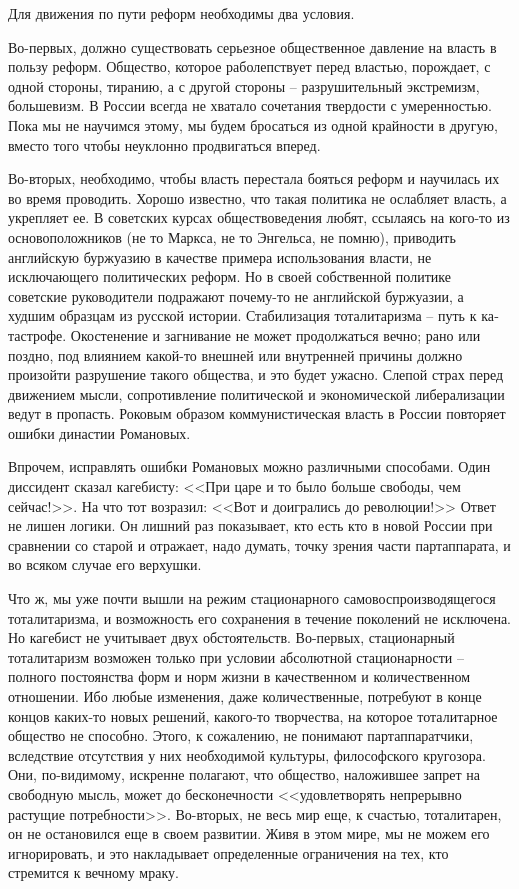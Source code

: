 \documentclass{book}
\begin{document}
Для движения по пути реформ необходимы два условия.

Во-первых, должно существовать серьезное общественное давление на власть в пользу реформ. Общество, которое раболепствует перед властью, порождает, с одной стороны, тиранию, а с другой стороны -- разрушительный экстремизм, большевизм. В России всегда не хватало сочетания твердости с уме­ренностью. Пока мы не научимся этому, мы будем бросаться из одной крайности в другую, вместо того чтобы неуклонно продвигаться вперед.

Во-вторых, необходимо, чтобы власть перестала бояться реформ и научилась их во время проводить. Хорошо известно, что такая политика не ослабляет власть, а укрепляет ее. В советских курсах обществоведения любят, ссылаясь на кого-то из основоположников (не то Маркса, не то Энгельса, не помню), приводить английскую буржуазию в качестве примера использования власти, не исключающего политических реформ. Но в своей собственной политике советские руководители подра­жают почему-то не английской буржуазии, а худшим образцам из русской истории. Стабилизация тоталитаризма -- путь к ка­тастрофе. Окостенение и загнивание не может продолжаться вечно; рано или поздно, под влиянием какой-то внешней или внутренней причины должно произойти разрушение такого об­щества, и это будет ужасно. Слепой страх перед движением мысли, сопротивление политической и экономической либера­лизации ведут в пропасть. Роковым образом коммунистиче­ская власть в России повторяет ошибки династии Романовых.

Впрочем, исправлять ошибки Романовых можно различны­ми способами. Один диссидент сказал кагебисту: <<При царе и то было больше свободы, чем сейчас!>>. На что тот возразил: <<Вот и доигрались до революции!>> Ответ не лишен логики. Он лишний раз показывает, кто есть кто в новой России при сравнении со старой и отражает, надо думать, точку зрения части партаппарата, и во всяком случае его верхушки.

Что ж, мы уже почти вышли на режим стационарного самовоспроизводящегося тоталитаризма, и возможность его сохранения в течение поколений не исключена. Но кагебист не учитывает двух обстоятельств. Во-первых, стационарный тоталитаризм возможен только при условии абсолютной  стационарности -- полного постоянства форм и норм жизни в качественном и количественном отношении. Ибо любые изменения, даже количественные, потребуют в конце концов каких-то новых решений, какого-то творчества, на которое тоталитарное общество не способно. Этого, к сожалению, не понимают партаппаратчики, вследствие отсутствия у них необходимой куль­туры, философского кругозора. Они, по-видимому, искренне полагают, что общество, наложившее запрет на свободную мысль, может до бесконечности <<удовлетворять непрерывно растущие потребности>>. Во-вторых, не весь мир еще, к счастью, тоталитарен, он не остановился еще в своем развитии. Живя в этом мире, мы не можем его игнорировать, и это накладывает определенные ограничения на тех, кто стремится к 
вечному мраку.
\end{document}
